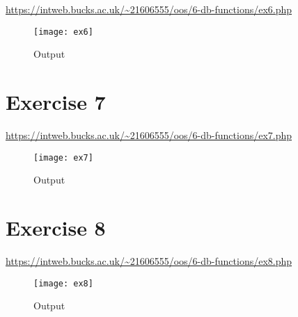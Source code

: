 \url{https://intweb.bucks.ac.uk/~21606555/oos/6-db-functions/ex6.php}

\captionsetup{type=figure}


\captionsetup{type=figure}


\begin{figure}[H]
  \caption{Output}
  \centering
  \texttt{[image: ex6]}
\end{figure}

\clearpage
\section{Exercise 7}

\url{https://intweb.bucks.ac.uk/~21606555/oos/6-db-functions/ex7.php}

\captionsetup{type=figure}


\captionsetup{type=figure}


\begin{figure}[H]
  \caption{Output}
  \centering
  \texttt{[image: ex7]}
\end{figure}

\clearpage
\section{Exercise 8}

\url{https://intweb.bucks.ac.uk/~21606555/oos/6-db-functions/ex8.php}

\captionsetup{type=figure}


\captionsetup{type=figure}


\begin{figure}[H]
  \caption{Output}
  \centering
  \texttt{[image: ex8]}
\end{figure}

